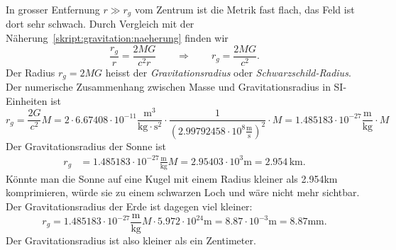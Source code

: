 In grosser Entfernung $r \gg r_g$ vom Zentrum ist die Metrik fast flach,
das Feld ist dort sehr schwach.
Durch Vergleich mit der Näherung~\eqref{skript:gravitation:naeherung}
finden wir
\[
\frac{r_g}{r} = \frac{2MG}{c^2r}
\qquad\Rightarrow\qquad
r_g=\frac{2MG}{c^2}.
\]
Der Radius $r_g=2MG$ heisst der {\em Gravitationsradius} oder 
{\em Schwarzschild-Radius}.
Der numerische Zusammenhang zwischen Masse und Gravitationsradius
in SI-Einheiten ist
\[
r_g = \frac{2G}{c^2}M
=
2\cdot 6.67408\cdot10^{-11}
\frac{\text{m}^3}{\text{kg}\cdot\text{s}^2}
\cdot
\frac1{(2.99792458\cdot 10^{8}\frac{\text{m}}{\text{s}})^2}\cdot M
=
1.485183\cdot 10^{-27}\frac{\text{m}}{\text{kg}}\cdot M
\]
Der Gravitationsradius der Sonne ist 
\begin{align*}
r_g
&=
1.485183\cdot 10^{-27}\frac{\text{m}}{\text{kg}}M
=
2.95403\cdot 10^{3}\text{m}
=
2.954\,\text{km}.
\end{align*}
Könnte man die Sonne auf eine Kugel mit einem Radius kleiner als 2.954km
komprimieren, würde sie zu einem schwarzen Loch und wäre nicht mehr
sichtbar.
Der Gravitationsradius der Erde ist dagegen viel kleiner:
\[
r_g
=
1.485183\cdot 10^{-27}\frac{\text{m}}{\text{kg}}M
\cdot
5.972\cdot 10^{24}\text{m}
=
8.87\cdot 10^{-3}\text{m}
=
8.87\text{mm}.
\]
Der Gravitationsradius ist also kleiner als ein Zentimeter.




